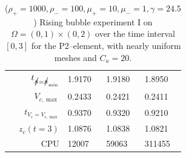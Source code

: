 \begin{table}
\begin{tabular}{rlll}
$t_{\strikes = \strikes_{\min}}$ & 1.9170 & 1.9180 & 1.8950 \\
$V_{c,\max}$                     & 0.2433 & 0.2421 & 0.2411 \\
$t_{V_c = V_{c,\max}}$           & 0.9370 & 0.9320 & 0.9210 \\
$z_c(t=3)$                       & 1.0876 & 1.0838 & 1.0821 \\
CPU                              &  12007 &  59063 & 311455 \\
\hline
\end{tabular}
\hspace*{-3.25cm}
\caption[Navier--Stokes rising bubble I benchmark values P2--\pdg]
{($\rho_+ = 1000,\rho_- = 100,\mu_+ = 10,\mu_- =1,\gamma = 24.5$)
Rising bubble experiment I on ${\Omega = (0,1) \times (0,2)}$ over the time
interval $[0,3]$ for the P2--\pdg element, with nearly uniform meshes and
$C_a=20$\textdegree.}
\label{tab:risingbubbleIp2p1dg}
\end{table}

